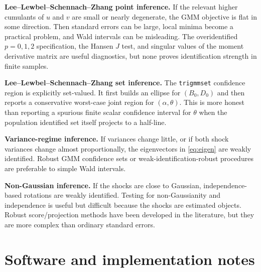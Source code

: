 \documentclass[11pt]{article}
\theoremstyle{plain}
\theoremstyle{definition}
\theoremstyle{remark}
\newcommand{\heading}[1]{\vspace{0.5em}\noindent\textbf{#1}}
\begin{document}
\heading{Lee--Lewbel--Schennach--Zhang point inference.}
If the relevant higher cumulants of $u$ and $v$ are small or nearly degenerate,
the GMM objective is flat in some direction. Then standard errors can be large,
local minima become a practical problem, and Wald intervals can be misleading.
The overidentified $p=0,1,2$ specification, the Hansen $J$ test, and singular
values of the moment derivative matrix are useful diagnostics, but none proves
identification strength in finite samples.

\heading{Lee--Lewbel--Schennach--Zhang set inference.}
The \texttt{trigmmset} confidence region is explicitly set-valued. It first builds
an ellipse for $(B_0,D_0)$ and then reports a conservative worst-case joint
region for $(\alpha,\theta)$. This is more honest than reporting a spurious
finite scalar confidence interval for $\theta$ when the population identified set
itself projects to a half-line.

\heading{Variance-regime inference.}
If variances change little, or if both shock variances change almost
proportionally, the eigenvectors in \eqref{eq:eigen} are weakly identified. Robust
GMM confidence sets or weak-identification-robust procedures are preferable to
simple Wald intervals.

\heading{Non-Gaussian inference.}
If the shocks are close to Gaussian, independence-based rotations are weakly
identified. Testing for non-Gaussianity and independence is useful but difficult
because the shocks are estimated objects. Robust score/projection methods have
been developed in the literature, but they are more complex than ordinary
standard errors.

\section{Software and implementation notes}
\label{sec:software}
\end{document}
